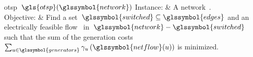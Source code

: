%
\begin{problem}[framed]{\acrlong{otsp}~$\gls{otsp}(\glssymbol{network})$}%
  Instance: & A network~.\\%
  Objective: & Find a set~$\glssymbol{switched}\subseteq\glssymbol{edges}$ and
  an electrically feasible flow~ in~$
  \glssymbol{network}-\glssymbol{switched}$ such that the sum of the generation
  costs~$\sum_{\vertexa\in\glssymbol{generators}}\gamma_\vertexa\left(
  \glssymbol{netflow}(\vertexa)\right)$ is minimized.%
\end{problem}%